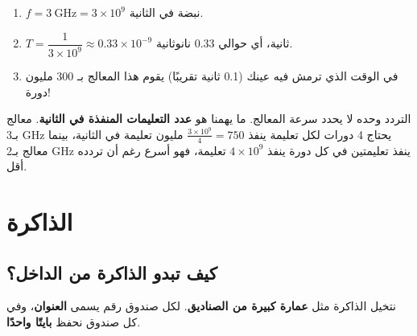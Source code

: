 \begin{khatwa}
    \begin{enumerate}
        \item $f = 3\ \text{GHz} = 3 \times 10^{9}$ نبضة في الثانية.
        \item $T = \dfrac{1}{3 \times 10^{9}} \approx 0.33 \times 10^{-9}$ ثانية، أي حوالي
              \textenglish{0.33} نانوثانية.
        \item في الوقت الذي ترمش فيه عينك (\textenglish{0.1} ثانية تقريبًا) يقوم هذا المعالج بـ
              \textenglish{300} مليون دورة!
    \end{enumerate}
\end{khatwa}

\begin{intabih}
    التردد وحده لا يحدد سرعة المعالج. ما يهمنا هو \textbf{عدد التعليمات المنفذة في الثانية}.
    معالج بـ\textenglish{3 GHz} يحتاج 4 دورات لكل تعليمة ينفذ $\frac{3 \times 10^9}{4} = 750$ مليون تعليمة
    في الثانية، بينما معالج بـ\textenglish{2 GHz} ينفذ تعليمتين في كل دورة ينفذ $4 \times 10^9$ تعليمة، فهو
    أسرع رغم أن تردده أقل.
\end{intabih}

\section{الذاكرة}

\subsection{كيف تبدو الذاكرة من الداخل؟}
نتخيل الذاكرة مثل \textbf{عمارة كبيرة من الصناديق}. لكل صندوق رقم يسمى \textbf{العنوان}،
وفي كل صندوق نحفظ \textbf{بايتًا واحدًا}.

\begin{center}
\end{center}

